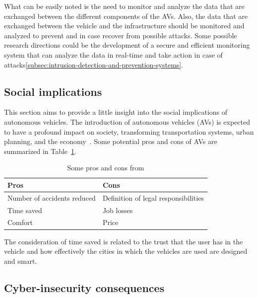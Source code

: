 What can be easily noted is the need to monitor and analyze the data that are exchanged between the different components of the AVs.
Also, the data that are exchanged between the vehicle and the infrastructure should be monitored and analyzed to prevent and in case recover from possible attacks.
Some possible research directions could be the development of a secure and efficient monitoring system that can analyze the data in real-time and take action in case of attacks\ref{subsec:intrusion-detection-and-prevention-systems}.

\subsection{Social implications}\label{subsec:social-implications}

This section aims to provide a little insight into the social implications of autonomous vehicles.
The introduction of autonomous vehicles (AVs) is expected to have a profound impact on society\cite{thomas2020perception},
transforming transportation systems\cite{intelligent_transportation_2023}, urban planning\cite{impact_autonomous_vehicles_2018},
and the economy~\cite{economic_aspects_2020}.
Some potential pros and cons of AVs are summarized in Table~\ref{tab:table}.

\begin{table}[ht]
    \centering
    \begin{tabular}{|l|l|}
        \hline
        \textbf{Pros} & \textbf{Cons} \\ \hline
        Number of accidents reduced & Definition of legal responsibilities \\ \hline
        Time saved & Job losses \\ \hline
        Comfort & Price \\ \hline
    \end{tabular}
    \caption{Some pros and cons from \cite{ahangar2021survey} }\label{tab:table}
\end{table}

The consideration of time saved
is related to the trust that the user has in the vehicle and how effectively the cities in which the vehicles are used are designed and smart.

\subsection{Cyber-insecurity consequences}\label{subsec:cyber-insecurity}

